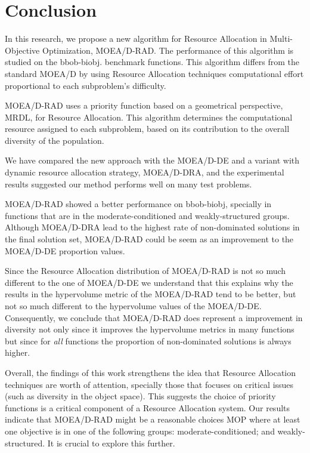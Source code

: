\section{Conclusion}

In this research, we propose a new algorithm for Resource Allocation in Multi-Objective Optimization, MOEA/D-RAD. The performance of this algorithm is studied on the bbob-biobj. benchmark functions. This algorithm differs from the standard MOEA/D by using Resource Allocation techniques computational effort proportional to each subproblem's difficulty. 

MOEA/D-RAD uses a priority function based on a geometrical perspective, MRDL, for Resource Allocation. This algorithm determines the computational resource assigned to each subproblem, based on its contribution to the overall diversity of the population.

We have compared the new approach with the MOEA/D-DE and a variant with dynamic resource allocation strategy, MOEA/D-DRA, and the experimental results suggested our method performs well on many test problems.

MOEA/D-RAD showed a better performance on bbob-biobj, specially in functions that are in the  moderate-conditioned and weakly-structured groups. Although MOEA/D-DRA lead to the highest rate of non-dominated solutions in the final solution set, MOEA/D-RAD could be seem as an improvement to the MOEA/D-DE proportion values.

Since the Resource Allocation distribution of MOEA/D-RAD is not so much different to the one of MOEA/D-DE we understand that this explains why the results in the hypervolume metric of the MOEA/D-RAD tend to be better, but not so much different to the hypervolume values of the MOEA/D-DE. Consequently, we conclude that MOEA/D-RAD does represent a improvement in diversity not only since it improves the hypervolume metrics in many functions but since for \textit{all} functions the proportion of non-dominated solutions is always higher.

Overall, the findings of this work strengthens the idea that Resource Allocation techniques are worth of attention, specially those that focuses on critical issues (such as diversity in the object space). This suggests the choice of priority functions is a critical component of a Resource Allocation system. Our results indicate that MOEA/D-RAD might be a  reasonable choices MOP where at least one objective is in one of the following groups: moderate-conditioned; and weakly-structured. It is crucial to  explore this further.


